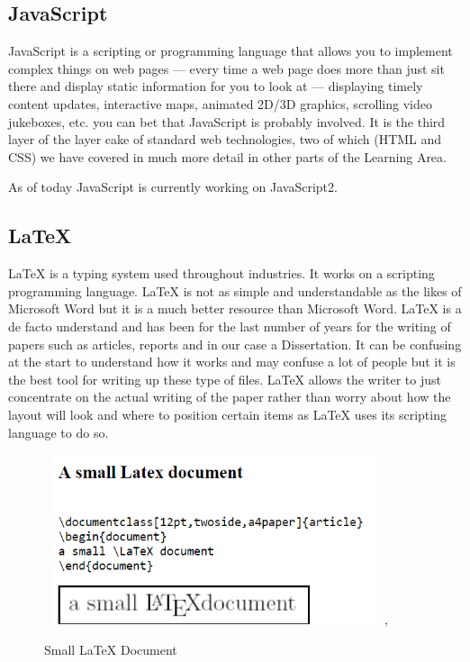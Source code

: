 \documentclass[12pt,a4paper,oneside,openany]{book}
\begin{document}
\subsection{JavaScript}
JavaScript is a scripting or programming language that allows you to implement complex things on web pages — every time a web page does more than just sit there and display static information for you to look at — displaying timely content updates, interactive maps, animated 2D/3D graphics, scrolling video jukeboxes, etc. you can bet that JavaScript is probably involved. It is the third layer of the layer cake of standard web technologies, two of which (HTML and CSS) we have covered in much more detail in other parts of the Learning Area. \cite{js}

As of today JavaScript is currently working on JavaScript2.

\subsection{LaTeX}
LaTeX is a typing system used throughout industries. It works on a scripting programming language. LaTeX is not as simple and understandable as the likes of Microsoft Word but it is a much better resource than Microsoft Word. LaTeX is a de facto understand and has been for the last number of years for the writing of papers such as articles, reports and in our case a Dissertation. It can be confusing at the start to understand how it works and may confuse a lot of people but it is the best tool for writing up these type of files. LaTeX allows the writer to just concentrate on the actual writing of the paper rather than worry about how the layout will look and where to position certain items as LaTeX uses its scripting language to do so. \cite{latex}

\begin{figure}[ht]
\renewcommand\thefigure{4.6}
\centering
\includegraphics[width=10cm, height=5cm]{Images/latex.png},
\caption{Small LaTeX Document}
\label{latex}
\end{figure}
\end{document}
